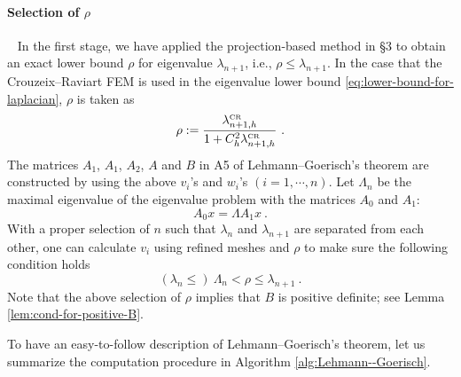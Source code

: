 \documentclass[a4,11pt]{article}
\numberwithin{equation}{section}
\newcommand{\CR}{\mbox{\tiny{CR}}}
\begin{document}
\paragraph{Selection of $\rho$}
~
In the first stage, we have applied  the projection-based method in \S 3 to obtain an exact lower bound $\rho$ for eigenvalue $\lambda_{n+1}$, i.e., $\rho \le \lambda_{n+1}$. 
In the case that the Crouzeix--Raviart FEM is used in the eigenvalue lower bound \eqref{eq:lower-bound-for-laplacian}, 
$\rho$ is taken as
$$
\rho:= \frac{\lambda^{\CR}_{n+1,h}}{1+C_h^2 \lambda^{\CR}_{n+1,h}}~.
$$
The matrices $A_1$, $A_1$, $A_2$, $A$ and $B$ in A5 of Lehmann--Goerisch's theorem are constructed by using the above $v_{i}$'s and $w_i$'s $(i=1,\cdots, n)$.
Let $\Lambda_n$ be the maximal eigenvalue of the  eigenvalue problem with the matrices $A_0$ and $A_1$:
\begin{equation}
\label{eq:Lambda-n-LG}	
A_0x=\Lambda A_1 x~.
\end{equation} 
With a proper selection of $n$ such that $\lambda_n$ and $\lambda_{n+1}$ are separated from each other, one can calculate $v_{i}$ using refined meshes and $\rho$ to make sure the following condition holds
$$
(\lambda_n\le )~\Lambda_{n} < \rho \le \lambda_{n+1}~.
$$
Note that the above selection of $\rho$ implies  that $B$ is  positive definite; see Lemma   \ref{lem:cond-for-positive-B}.

\medskip

To have an easy-to-follow description of Lehmann--Goerisch's theorem, let us summarize the computation procedure in Algorithm \ref{alg:Lehmann--Goerisch}. 
\end{document}
